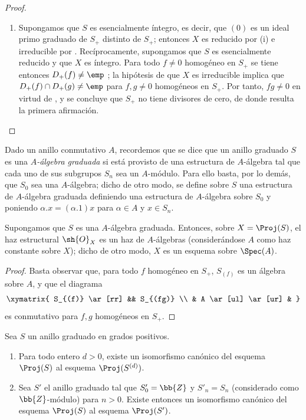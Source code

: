 \documentclass[oneside,10pt]{amsart}
\newcommand{\oldpage}[2][]{\marginnote{\normalfont\footnotesize\textbf{#1}~|~#2}\ignorespaces}
\let\EGAOriginalLabel\label
\renewcommand{\label}[1]{\phantomsection\EGAOriginalLabel{#1}}
\begin{document}
\begin{proof}
\begin{enumerate}
  \item[\rm(ii)] Supongamos que $S$ es esencialmente íntegro, es decir, que $(0)$ es un ideal primo graduado de $S_+$ distinto de $S_+$; entonces $X$ es reducido por (i) e irreducible por .
  Recíprocamente, supongamos que $S$ es esencialmente reducido y que $X$ es íntegro.
  Para todo $f\neq0$ homogéneo en $S_+$ se tiene entonces $D_+(f)\neq\emp$ ; la hipótesis de que $X$ es irreducible implica que $D_+(f)\cap D_+(g)\neq\emp$ para $f,g\neq0$ homogéneos en $S_+$.
  Por tanto, $fg\neq0$ en virtud de , y se concluye que $S_+$ no tiene divisores de cero, de donde resulta la primera afirmación.
\end{enumerate}
\end{proof}

\begin{env}[2.4.5]
\label{II.2.4.5}
Dado un anillo conmutativo $A$, recordemos que se dice que un anillo graduado $S$ es una \emph{$A$-álgebra graduada} si está provisto de una estructura de $A$-álgebra tal que cada uno de sus subgrupos $S_n$ sea un $A$-módulo.
Para ello basta, por lo demás, que $S_0$ sea
\oldpage[II]{30}
una $A$-álgebra; dicho de otro modo, se define sobre $S$ una estructura de $A$-álgebra graduada definiendo una estructura de $A$-álgebra sobre $S_0$ y poniendo $\alpha.x=(\alpha.1)x$ para $\alpha\in A$ y $x\in S_n$.
\end{env}

\begin{proposition}[2.4.6]
\label{II.2.4.6}
Supongamos que $S$ es una $A$-álgebra graduada.
Entonces, sobre $X=\Proj(S)$, el haz estructural $\sh{O}_X$ es un haz de $A$-álgebras (considerándose $A$ como haz constante sobre $X$); dicho de otro modo, $X$ es un esquema sobre $\Spec(A)$.
\end{proposition}

\begin{proof}
Basta observar que, para todo $f$ homogéneo en $S_+$, $S_{(f)}$ es un álgebra sobre $A$, y que el diagrama
\[
  \xymatrix{
    S_{(f)} \ar[rr] && S_{(fg)}
  \\ & A \ar[ul] \ar[ur] &
  }
\]
es conmutativo para $f,g$ homogéneos en $S_+$.
\end{proof}

\begin{proposition}[2.4.7]
\label{II.2.4.7}
Sea $S$ un anillo graduado en grados positivos.
\begin{enumerate}
  \item[\rm(i)] Para todo entero $d>0$, existe un isomorfismo canónico del esquema $\Proj(S)$ al esquema $\Proj(S^{(d)})$.
  \item[\rm(ii)] Sea $S'$ el anillo graduado tal que $S'_0=\bb{Z}$ y $S'_n=S_n$ (considerado como $\bb{Z}$-módulo) para $n>0$. Existe entonces un isomorfismo canónico del esquema $\Proj(S)$ al esquema $\Proj(S')$.
\end{enumerate}
\end{proposition}
\end{document}
